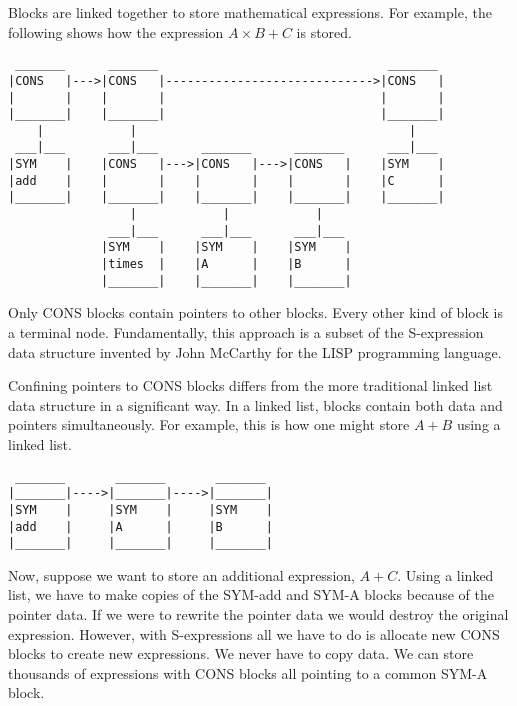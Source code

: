 \noindent
Blocks are linked together to store mathematical expressions.
For example, the following shows how the expression
$A\times B+C$ is stored.
\begin{verbatim}
 _______      _______                                _______
|CONS   |--->|CONS   |----------------------------->|CONS   |
|       |    |       |                              |       |
|_______|    |_______|                              |_______|
    |            |                                      |
 ___|___      ___|___      _______      _______      ___|___
|SYM    |    |CONS   |--->|CONS   |--->|CONS   |    |SYM    |
|add    |    |       |    |       |    |       |    |C      |
|_______|    |_______|    |_______|    |_______|    |_______|
                 |            |            |
              ___|___      ___|___      ___|___
             |SYM    |    |SYM    |    |SYM    |
             |times  |    |A      |    |B      |
             |_______|    |_______|    |_______|
\end{verbatim}

\bigskip
\noindent
Only CONS blocks contain pointers to other blocks.
Every other kind of block is a terminal node.
Fundamentally, this approach is a subset of the S-expression data structure
invented by John McCarthy for the LISP programming language.

\newpage

\noindent
Confining pointers to CONS blocks differs from the more traditional linked
list data structure in a significant way.
In a linked list, blocks contain both data and pointers simultaneously.
For example, this is how one might store $A+B$ using a linked list.
\begin{verbatim}
 _______       _______       _______
|_______|---->|_______|---->|_______|
|SYM    |     |SYM    |     |SYM    |
|add    |     |A      |     |B      |
|_______|     |_______|     |_______|
\end{verbatim}

\bigskip
\noindent
Now, suppose we want to store an additional expression, $A+C$.
Using a linked list, we have to make copies of the SYM-add and
SYM-A blocks
because of the pointer data.
If we were to rewrite the pointer data we would destroy the original
expression.
However, with S-expressions all we have to do is allocate new CONS
blocks to create new expressions.
We never have to copy data.
We can store thousands of expressions with CONS
blocks all pointing to a common SYM-A block.

\newpage

